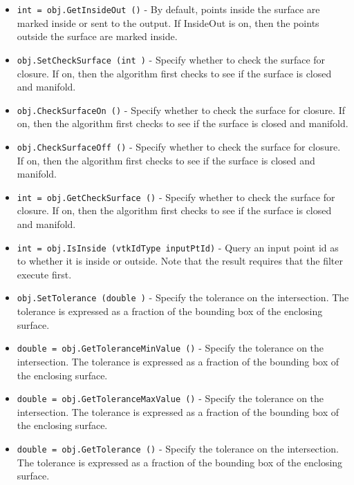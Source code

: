 \begin{itemize}
\item  \verb|int = obj.GetInsideOut ()| -  By default, points inside the surface are marked inside or sent to
 the output. If InsideOut is on, then the points outside the surface
 are marked inside.

\item  \verb|obj.SetCheckSurface (int )| -  Specify whether to check the surface for closure. If on, then the
 algorithm first checks to see if the surface is closed and manifold.

\item  \verb|obj.CheckSurfaceOn ()| -  Specify whether to check the surface for closure. If on, then the
 algorithm first checks to see if the surface is closed and manifold.

\item  \verb|obj.CheckSurfaceOff ()| -  Specify whether to check the surface for closure. If on, then the
 algorithm first checks to see if the surface is closed and manifold.

\item  \verb|int = obj.GetCheckSurface ()| -  Specify whether to check the surface for closure. If on, then the
 algorithm first checks to see if the surface is closed and manifold.

\item  \verb|int = obj.IsInside (vtkIdType inputPtId)| -  Query an input point id as to whether it is inside or outside. Note that
 the result requires that the filter execute first.

\item  \verb|obj.SetTolerance (double )| -  Specify the tolerance on the intersection. The tolerance is expressed
 as a fraction of the bounding box of the enclosing surface.

\item  \verb|double = obj.GetToleranceMinValue ()| -  Specify the tolerance on the intersection. The tolerance is expressed
 as a fraction of the bounding box of the enclosing surface.

\item  \verb|double = obj.GetToleranceMaxValue ()| -  Specify the tolerance on the intersection. The tolerance is expressed
 as a fraction of the bounding box of the enclosing surface.

\item  \verb|double = obj.GetTolerance ()| -  Specify the tolerance on the intersection. The tolerance is expressed
 as a fraction of the bounding box of the enclosing surface.


\end{itemize}
